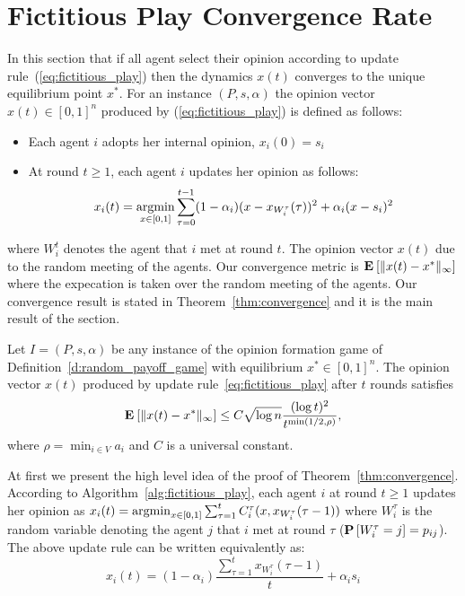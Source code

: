 \section{Fictitious Play Convergence Rate}\label{s:fictitious_convergence}
In this section that if all agent select their opinion according to update rule~(\ref{eq:fictitious_play})
then the dynamics $x(t)$ converges to the unique equilibrium point $x^*$.
For an instance $(P,s,\alpha)$ the opinion vector $x(t) \in [0,1]^n$ produced by (\ref{eq:fictitious_play})
is defined as follows:
\begin{itemize}
 \item Each agent $i$ adopts her internal opinion, $x_i(0)=s_i$
 \item At round $t \geq 1$, each agent $i$ updates her opinion as follows:
 \begin{equation}\label{eq:fictitious_play}
  x_i(t) =\operatorname*{argmin}_{x \in [0,1]}\sum_{\tau=0}^{t-1}(1-\alpha_i)(x-x_{W_i^\tau}(\tau))^2+\alpha_i(x-s_i)^2
\end{equation}
\end{itemize}
where $W_i^t$ denotes the agent that $i$ met at round $t$. The opinion vector $x(t)$ 
due to the random meeting of the agents. Our convergence metric is $\bm{\mathrm{E}}_{} \left[ \| x(t) - x^* \|_{\infty} \right]$
where the expecation is taken over the random meeting of the agents. Our convergence result is stated in Theorem~\ref{thm:convergence}
and it is the main result of the section.  
\begin{theorem}\label{t:fictitious_convergence}
  Let $I = (P,s, \alpha)$ be any instance of the opinion formation
  game of Definition~\ref{d:random_payoff_game} with equilibrium
  $x^* \in [0,1]^n$.  The opinion vector $x(t)$ produced by
  update rule~\ref{eq:fictitious_play} after $t$ rounds satisfies
  \[
    \bm{\mathrm{E}}_{} \left[ \| x(t) - x^* \|_{\infty} \right] \leq
    C \sqrt{\log n}\frac{(\log t)^{2}}{t^{\min(1/2,\rho)}},
  \]
  where $\rho = \min_{i \in V} a_i$ and $C$ is a universal constant.
\end{theorem}
\noindent At first we present the high level idea of the proof of Theorem~\ref{thm:convergence}.
According to Algorithm~\ref{alg:fictitious_play}, each agent $i$ at round $t\geq 1$ updates her opinion 
as $x_i(t)=\operatorname*{argmin}_{x \in [0,1]}\sum_{\tau=1}^tC^{\tau}_i(x,x_{W_i^{\tau}}(\tau-1))$
where $W_i^\tau$ is the random variable denoting the agent $j$ that $i$ met at round $\tau$ ($\bm{\mathrm{P}}\left[W_i^\tau=j\right]=p_{ij}$). 
The above update rule can be written equivalently as: \[x_i(t)=(1-\alpha_i)\frac{\sum_{\tau=1}^{t} x_{W_i^\tau}(\tau-1)}{t}+ \alpha_i s_i\]
